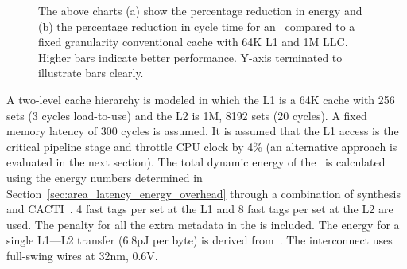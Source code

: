{{\begin{figure}[!h]
    \caption[Overall performance and energy]{The above charts (a) show the percentage reduction in energy and (b) the percentage reduction in cycle time for an \AC\ compared to a fixed granularity conventional cache with 64K L1 and 1M LLC. Higher bars indicate better performance. Y-axis terminated to illustrate bars clearly.}
    \label{plot:multi_sys_perf_energy}
\end{figure}

\clearpage

A two-level cache hierarchy is modeled in which the L1 is a 64K cache with 256 sets (3 cycles load-to-use) and the L2 is 1M, 8192 sets (20 cycles). A fixed memory latency of 300 cycles is assumed. It is assumed that the L1 access is the critical pipeline stage and throttle CPU clock by 4\% (an alternative approach is evaluated in the next section).  The total dynamic energy of the \AC\ is calculated using the energy numbers determined in Section~\ref{sec:area_latency_energy_overhead} through a combination of synthesis and CACTI~\cite{Muralimanohar:2007:ONO:1331699.1331704}. 4 fast tags per set at the L1 and 8 fast tags per set at the L2 are used. The penalty for all the extra metadata in the \AC{} is included. The energy for a single L1---L2 transfer (6.8pJ per byte) is derived from~\cite{weti,Muralimanohar:2007:ONO:1331699.1331704}. The interconnect uses full-swing wires at 32nm, 0.6V. 

}}
